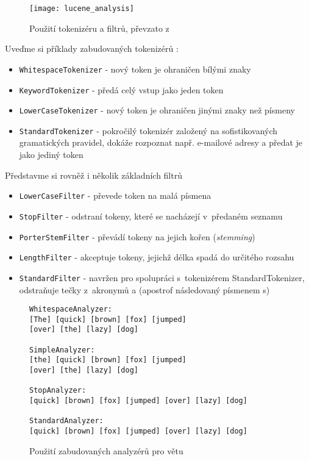 \documentclass[11pt,oneside]{fithesis2}
\begin{document}
\begin{figure}[htp]
	\begin{center}
		\texttt{[image: lucene\_analysis]}
	\end{center}
	\caption{Použití tokenizéru a filtrů, převzato z~ \cite[s.~117]{LuceneAction}}	
	\label{AnalysisLucene}
\end{figure}

Uveďme si příklady zabudovaných tokenizérů  \cite[s.~118]{LuceneAction}:

\begin{itemize}
	\item \texttt{WhitespaceTokenizer} - nový token je ohraničen bílými znaky
	\item \texttt{KeywordTokenizer} - předá celý vstup jako jeden token
	\item \texttt{LowerCaseTokenizer} - nový token je ohraničen jinými znaky než písmeny
	\item \texttt{StandardTokenizer} - pokročilý tokenizér založený na sofistikovaných gramatických pravidel, dokáže rozpoznat např. e-mailové adresy a předat je jako jediný token
\end{itemize}

Představme si rovněž i několik základních filtrů  \cite[s.~118]{LuceneAction}
\begin{itemize}
	\item \texttt{LowerCaseFilter} - převede token na malá písmena
	\item \texttt{StopFilter} - odstraní tokeny, které se nacházejí v~předaném seznamu
	\item \texttt{PorterStemFilter} - převádí tokeny na jejich kořen (\emph{stemming})
	\item \texttt{LengthFilter} - akceptuje tokeny, jejichž délka spadá do určitého rozsahu
	\item \texttt{StandardFilter} - navržen pro spolupráci s~tokenizérem StandardTokenizer, odstraňuje tečky z~akronymů a  (apostrof následovaný písmenem s)
\end{itemize}

\begin{figure}[!htbp]
\begin{lstlisting}[frame=single]
WhitespaceAnalyzer:
[The] [quick] [brown] [fox] [jumped]
[over] [the] [lazy] [dog]

SimpleAnalyzer:
[the] [quick] [brown] [fox] [jumped] 
[over] [the] [lazy] [dog]

StopAnalyzer:
[quick] [brown] [fox] [jumped] [over] [lazy] [dog]

StandardAnalyzer:
[quick] [brown] [fox] [jumped] [over] [lazy] [dog]
\end{lstlisting}
\caption{Použití zabudovaných analyzérů pro větu \emph{}}
\label{AnalysisExample1}
\end{figure}
\end{document}
